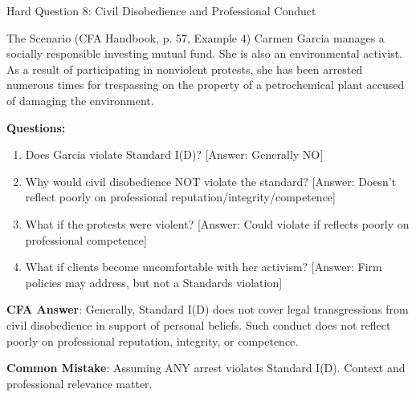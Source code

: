 \documentclass{beamer}
\begin{document}
	\begin{frame}{Hard Question 8: Civil Disobedience and Professional Conduct}
		\begin{block}{The Scenario (CFA Handbook, p. 57, Example 4)}
			Carmen Garcia manages a socially responsible investing mutual fund. She is also an environmental activist. As a result of participating in nonviolent protests, she has been arrested numerous times for trespassing on the property of a petrochemical plant accused of damaging the environment.
		\end{block}
		
		\vspace{0.2cm}
		\textbf{Questions:}
		\begin{enumerate}
			\item Does Garcia violate Standard I(D)? \textcolor{cfared}{[Answer: Generally NO]}
			\item Why would civil disobedience NOT violate the standard? \textcolor{cfared}{[Answer: Doesn't reflect poorly on professional reputation/integrity/competence]}
			\item What if the protests were violent? \textcolor{cfared}{[Answer: Could violate if reflects poorly on professional competence]}
			\item What if clients become uncomfortable with her activism? \textcolor{cfared}{[Answer: Firm policies may address, but not a Standards violation]}
		\end{enumerate}
		
		\vspace{0.2cm}
		\textcolor{cfablue}{\textbf{CFA Answer}}: Generally, Standard I(D) does not cover legal transgressions from civil disobedience in support of personal beliefs. Such conduct does not reflect poorly on professional reputation, integrity, or competence.
		
		\vspace{0.1cm}
		\textcolor{cfared}{\textbf{Common Mistake}}: Assuming ANY arrest violates Standard I(D). Context and professional relevance matter.
	\end{frame}
	
\end{document}
